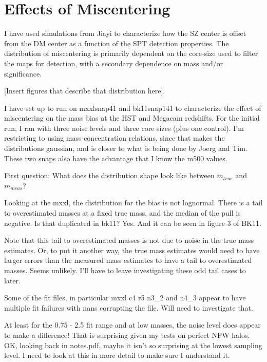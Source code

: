 \documentclass[11pt]{article}
\begin{document}
\clearpage \newpage


\section{Effects of Miscentering}

I have used simulations from Jiayi to characterize how the SZ center is offset from the DM center as a function of the SPT detection properties. The distribution of miscentering is primarily dependent on the core-size used to filter the maps for detection, with a secondary dependence on mass and/or significance.

[Insert figures that describe that distribution here].

I have set up to run on mxxlsnap41 and bk11snap141 to characterize the effect of miscentering on the mass bias at the HST and Megacam redshifts. For the initial run, I ran with three noise levels and three core sizes (plus one control). I'm restricting to using mass-concentration relations, since that makes the distributions gaussian, and is closer to what is being done by Joerg and Tim. These two snaps also have the advantage that I know the m500 values.


First question: What does the distribution shape look like between $m_{true}$ and $m_{meas}$?

Looking at the mxxl, the distribution for the bias is not lognormal. There is a tail to overestimated masses at a fixed true mass, and the median of the pull is negative.  Is that duplicated in bk11? Yes. And it can be seen in figure 3 of BK11.

Note that this tail to overestimated masses is not due to noise in the true mass estimates. Or, to put it another way, the true mass estimates would need to have larger errors than the measured mass estimates to have a tail to overestimated masses. Seems unlikely. I'll have to leave investigating these odd tail cases to later.

Some of the fit files, in particular mxxl c4 r5 n3\_2 and n4\_3 appear to have multiple fit failures with nans corrupting the file. Will need to investigate that.

At least for the 0.75 - 2.5 fit range and at low masses, the noise level does appear to make a difference! That is surprising given my tests on perfect NFW halos.  OK, looking back in notes.pdf, maybe it isn't so surprising at the lowest sampling level. I need to look at this in more detail to make sure I understand it.
\end{document}
